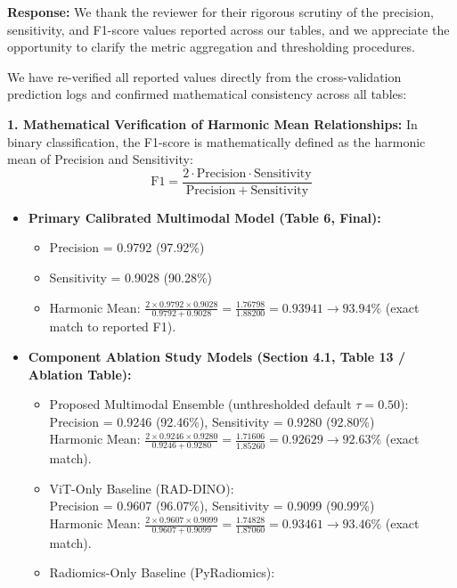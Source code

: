 \documentclass[11pt,a4paper]{article}
\newenvironment{authorresponse}{\par\begingroup\color{authorblue}}{\endgroup\par}
\begin{document}
\begin{authorresponse}
\textbf{Response:}
We thank the reviewer for their rigorous scrutiny of the precision, sensitivity, and F1-score values reported across our tables, and we appreciate the opportunity to clarify the metric aggregation and thresholding procedures.

We have re-verified all reported values directly from the cross-validation prediction logs and confirmed mathematical consistency across all tables:

\textbf{1. Mathematical Verification of Harmonic Mean Relationships:}
In binary classification, the F1-score is mathematically defined as the harmonic mean of Precision and Sensitivity:
\[
\mathrm{F1} = \frac{2 \cdot \mathrm{Precision} \cdot \mathrm{Sensitivity}}{\mathrm{Precision} + \mathrm{Sensitivity}}
\]
\begin{itemize}[leftmargin=2em]
  \item \textbf{Primary Calibrated Multimodal Model (Table 6, Final):}
  \begin{itemize}
    \item Precision = 0.9792 (97.92\%)
    \item Sensitivity = 0.9028 (90.28\%)
    \item Harmonic Mean: $\frac{2 \times 0.9792 \times 0.9028}{0.9792 + 0.9028} = \frac{1.76798}{1.88200} = 0.93941 \rightarrow \mathbf{93.94\%}$ (exact match to reported F1).
  \end{itemize}
  \item \textbf{Component Ablation Study Models (Section 4.1, Table 13 / Ablation Table):}
  \begin{itemize}
    \item Proposed Multimodal Ensemble (unthresholded default $\tau = 0.50$):\\
    Precision = 0.9246 (92.46\%), Sensitivity = 0.9280 (92.80\%)\\
    Harmonic Mean: $\frac{2 \times 0.9246 \times 0.9280}{0.9246 + 0.9280} = \frac{1.71606}{1.85260} = 0.92629 \rightarrow \mathbf{92.63\%}$ (exact match).
    \item ViT-Only Baseline (RAD-DINO):\\
    Precision = 0.9607 (96.07\%), Sensitivity = 0.9099 (90.99\%)\\
    Harmonic Mean: $\frac{2 \times 0.9607 \times 0.9099}{0.9607 + 0.9099} = \frac{1.74828}{1.87060} = 0.93461 \rightarrow \mathbf{93.46\%}$ (exact match).
    \item Radiomics-Only Baseline (PyRadiomics):\\

\end{itemize}
\end{itemize}
\end{authorresponse}
\end{document}
